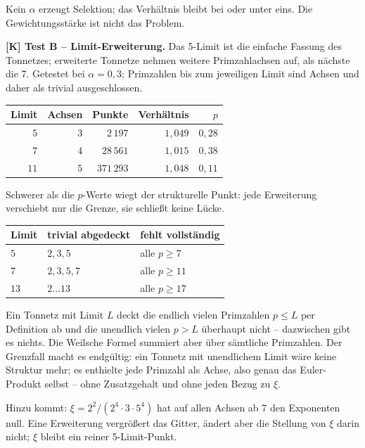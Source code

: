Kein $\alpha$ erzeugt Selektion; das Verh\"altnis bleibt bei oder unter
eins. Die Gewichtungsst\"arke ist nicht das Problem.

\textbf{[K] Test B -- Limit-Erweiterung.} Das 5-Limit ist die einfache
Fassung des Tonnetzes; erweiterte Tonnetze nehmen weitere
Primzahlachsen auf, als n\"achste die 7. Getestet bei $\alpha = 0{,}3$;
Primzahlen bis zum jeweiligen Limit sind Achsen und daher als trivial
ausgeschlossen.

\begin{center}
\begin{tabular}{rrrrr}
\toprule
Limit & Achsen & Punkte & Verh\"altnis & $p$ \\
\midrule
$5$ & $3$ & $2\,197$ & $1{,}049$ & $0{,}28$ \\
$7$ & $4$ & $28\,561$ & $1{,}015$ & $0{,}38$ \\
$11$ & $5$ & $371\,293$ & $1{,}048$ & $0{,}11$ \\
\bottomrule
\end{tabular}
\end{center}

Schwerer als die $p$-Werte wiegt der strukturelle Punkt: jede
Erweiterung verschiebt nur die Grenze, sie schlie\ss t keine L\"ucke.

\begin{center}
\begin{tabular}{lll}
\toprule
Limit & trivial abgedeckt & fehlt vollst\"andig \\
\midrule
$5$ & $2, 3, 5$ & alle $p \ge 7$ \\
$7$ & $2, 3, 5, 7$ & alle $p \ge 11$ \\
$13$ & $2 \ldots 13$ & alle $p \ge 17$ \\
\bottomrule
\end{tabular}
\end{center}

Ein Tonnetz mit Limit $L$ deckt die endlich vielen Primzahlen
$p \le L$ per Definition ab und die unendlich vielen $p > L$
\"uberhaupt nicht -- dazwischen gibt es nichts. Die Weilsche Formel
summiert aber \"uber s\"amtliche Primzahlen. Der Grenzfall macht es
endg\"ultig: ein Tonnetz mit unendlichem Limit w\"are keine Struktur
mehr; es enthielte jede Primzahl als Achse, also genau das
Euler-Produkt selbst -- ohne Zusatzgehalt und ohne jeden Bezug zu
$\xi$.

Hinzu kommt: $\xi = 2^2/(2^4\cdot 3\cdot 5^4)$ hat auf allen Achsen ab
7 den Exponenten null. Eine Erweiterung vergr\"o\ss ert das Gitter,
\"andert aber die Stellung von $\xi$ darin nicht; $\xi$ bleibt ein
reiner 5-Limit-Punkt.

